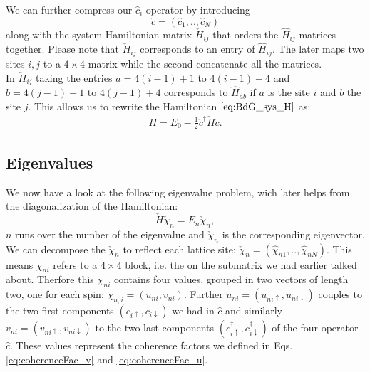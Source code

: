 \documentclass[../main.tex]{subfile}
\begin{document}
We can further compress our $\hat{c}_i$ operator by introducing 
\[
    \check{c} = (\hat{c}_1,..,\hat{c}_N)
\] 
along with the system Hamiltonian-matrix $\check{H}_{ij}$ that orders the $\hat{H}_{ij}$ matrices together.  
Please note that $\check{H}_{ij}$ corresponds to an entry of $\hat{H}_{ij}$. The later maps two sites $i,j$ to a $4\times4$ matrix while the second concatenate all the matrices.\\
In $\check{H}_{ij}$ taking the entries $a=4(i-1) + 1$ to $4(i-1) + 4$ and $b=4(j-1) + 1$ to $4(j-1) + 4$ corresponds to $\hat{H}_{ab}$ if $a$ is the site $i$ and $b$ the site $j$.
This allows us to rewrite the Hamiltonian $\ref{eq:BdG_sys_H}$ as:
\begin{align}
    H = E_0 - \frac{1}{2} \check{c}^\dagger \check{H} \check{c}.
\end{align}
\subsection{Eigenvalues}
We now have a look at the following eigenvalue problem, wich later helps from the diagonalization of the Hamiltonian:
\begin{equation}
    \label{eq:BdG_eigenVal_H} 
    \check{H} \check{\chi}_n = E_n \check{\chi}_n,
\end{equation}
$n$ runs over the number of the eigenvalue and $\check{\chi}_n$ is the corresponding eigenvector.
We can decompose the $\check{\chi}_n$ to reflect each lattice site: $\check{\chi}_n = (\hat{\chi}_{n1},..,\hat{\chi}_{nN})$. 
This means $\chi_{ni}$ refers to a $4\times4$ block, i.e. the on the submatrix we had earlier talked about.
Therfore this $\chi_{ni}$ contains four values, grouped in two vectors of length two, one for each spin: $\chi_{n,i} = (u_{ni}, v_{ni})$.
Further $u_{ni} = (u_{ni\uparrow}, u_{ni\downarrow})$ couples to the two first components $(c_{i\uparrow},c_{i\downarrow})$ we had in $\hat{c}$ and 
similarly $v_{ni} = (v_{ni\uparrow}, v_{ni\downarrow})$ to the two last components $(c_{i\uparrow}^{\dagger},c_{i\downarrow}^{\dagger})$ of
the four operator $\hat{c}$. These values represent the coherence factors we defined in Eqs.\ref{eq:coherenceFac_v} and \ref{eq:coherenceFac_u}.\\ 
\end{document}
